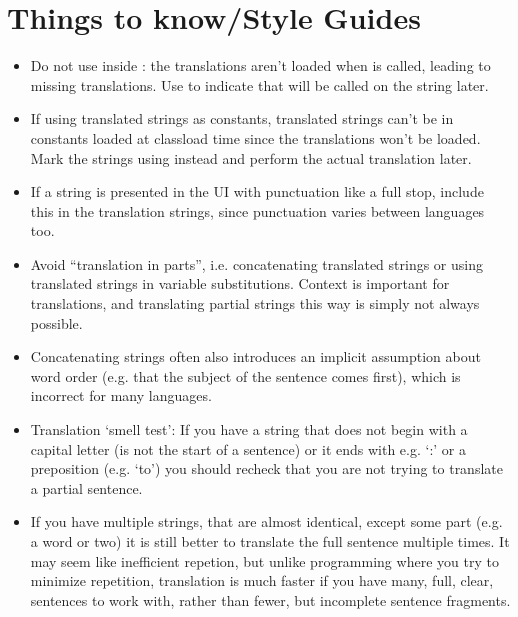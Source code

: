 \documentclass[letterpaper,10pt,openany,oneside,english]{sphinxmanual}
\begin{document}
\chapter{Things to know/Style Guides}
\label{\detokenize{translating-dev:things-to-know-style-guides}}\begin{itemize}
\item {} 
\sphinxAtStartPar
Do not use  inside : the translations aren’t loaded when  is called, leading to missing translations. Use  to indicate that  will be called on the string later.

\item {} 
\sphinxAtStartPar
If using translated strings as constants, translated strings can’t be in constants loaded at class\sphinxhyphen{}load time since the translations won’t be loaded. Mark the strings using  instead and perform the actual translation later.

\item {} 
\sphinxAtStartPar
If a string is presented in the UI with punctuation like a full stop, include this in the translation strings, since punctuation varies between languages too.

\item {} 
\sphinxAtStartPar
Avoid “translation in parts”, i.e. concatenating translated strings or using translated strings in variable substitutions. Context is important for translations, and translating partial strings this way is simply not always possible.

\item {} 
\sphinxAtStartPar
Concatenating strings often also introduces an implicit assumption about word order (e.g. that the subject of the sentence comes first), which is incorrect for many languages.

\item {} 
\sphinxAtStartPar
Translation ‘smell test’: If you have a string that does not begin with a capital letter (is not the start of a sentence) or it ends with e.g. ‘:’ or a preposition (e.g. ‘to’) you should recheck that you are not trying to translate a partial sentence.

\item {} 
\sphinxAtStartPar
If you have multiple strings, that are almost identical, except some part (e.g. a word or two) it is still better to translate the full sentence multiple times. It may seem like inefficient repetion, but unlike programming where you try to minimize repetition, translation is much faster if you have many, full, clear, sentences to work with, rather than fewer, but incomplete sentence fragments.

\end{itemize}
\end{document}
